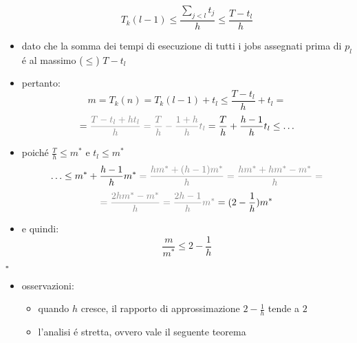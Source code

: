 \begin{flushleft}
\begin{itemize}
			$$T_k(l-1)\leq\frac{\sum_{j<l}t_j}{h}\leq\frac{T-t_l}{h}$$
		\item dato che la somma dei tempi di esecuzione di tutti i jobs assegnati prima di $p_l$ \'e al massimo ($\leq$) $T-t_l$
		\item pertanto:
			$$m=T_k(n)=T_k(l-1)+t_l\leq\frac{T-t_l}{h}+t_l=$$
			$$=\color{gray}\frac{T-t_l+ht_l}{h}=\frac{T}{h}-\frac{1+h}{h}t_l\color{black}=\frac{T}{h}+\frac{h-1}{h}t_l\leq\ldots$$
		\item poich\'e $\frac{T}{h}\leq m^*$ e $t_l\leq m^*$
			$$\ldots\leq m^*+\frac{h-1}{h}m^*\color{gray}=\frac{hm^*+(h-1)m^*}{h}=\frac{hm^*+hm^*-m^*}{h}=$$
			$$\color{gray}=\frac{2hm^*-m^*}{h}=\frac{2h-1}{h}m^*\color{black}=(2-\frac{1}{h})m^*$$
		\item e quindi:
			$$\frac{m}{m^*}\leq 2-\frac{1}{h}$$
	\end{itemize}
	\hfill$\square$
	\begin{itemize}
		\item osservazioni:
		\begin{itemize}
			\item quando $h$ cresce, il rapporto di approssimazione $2-\frac{1}{h}$ tende a $2$
			\item l'analisi \'e stretta, ovvero vale il seguente teorema
		\end{itemize}
	\end{itemize}
\end{flushleft}


